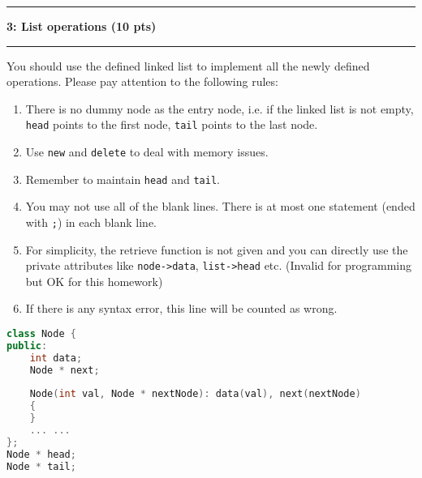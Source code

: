 \documentclass[10.5pt]{article}
\newcommand\question[2]{\vspace{.25in}\hrule\textbf{#1: #2}\vspace{.5em}\hrule\vspace{.10in}}
\begin{document}
	\pagebreak

	\question{3}{List operations (10 pts)}
	
	You should use the defined linked list to implement all the newly defined operations. Please pay attention to the following rules:
	\begin{enumerate}
		\item There is no dummy node as the entry node, i.e. if the linked list is not empty, 
		\texttt{head} points to the first node,
		\texttt{tail} points to the last node.
		\item Use \texttt{new} and \texttt{delete} to deal with memory issues.
		\item Remember to maintain \texttt{head} and \texttt{tail}.
		\item You may not use all of the blank lines. There is at most one statement (ended with \texttt{;}) in each blank line.
		\item For simplicity, the retrieve function is not given and you can directly use the private attributes like \texttt{node->data}, \texttt{list->head} etc. (Invalid for programming but OK for this homework)
		\item If there is any syntax error, this line will be counted as wrong.
	\end{enumerate}
	
	\hrulefill
	
	\begin{lstlisting}[language=C++,moreclass={Node}]
class Node {
public:
	int data;
	Node * next;
	
	Node(int val, Node * nextNode): data(val), next(nextNode)
	{
	}
	... ...
};
Node * head;
Node * tail;
	\end{lstlisting}    
	
\end{document}
